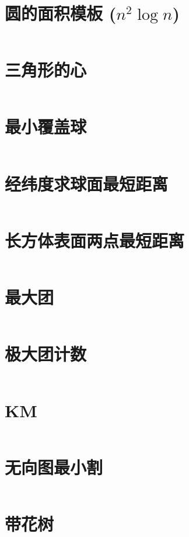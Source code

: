 \documentclass[titlepage,landscape,a4paper,10pt]{article}
\begin{document}
\begin{multicols}{2}
\begin{spacing}{0.8}
\section{圆的面积模板 ($n^2\log n$)}
\inputminted{cpp}{src/圆的面积模板.cpp}

\section{三角形的心}
\inputminted{cpp}{src/三角形的心.cpp}

\section{最小覆盖球}
\inputminted{cpp}{src/最小覆盖球.cpp}

\section{经纬度求球面最短距离}
\inputminted{cpp}{src/经纬度求球面最短距离.cpp}

\section{长方体表面两点最短距离}
\inputminted{cpp}{src/长方体表面两点最短距离.cpp}

\section{最大团}
\inputminted{cpp}{src/最大团.cpp}

\section{极大团计数}
\inputminted{cpp}{src/极大团计数.cpp}

\section{KM}
\inputminted{cpp}{src/KM.cpp}

\section{无向图最小割}
\inputminted{cpp}{src/无向图最小割.cpp}

\section{带花树}
\inputminted{cpp}{src/带花树.cpp}


\end{spacing}
\end{multicols}
\end{document}
